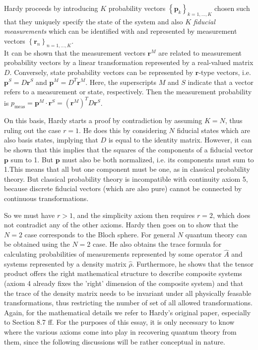 \documentclass[11pt, a4paper]{article}
\begin{document}
Hardy proceeds by introducing $K$ probability vectors $\left\{\mathbf p_k\right\}_{k=1,\ldots,K}$ chosen such that they uniquely specify the state of the system and also $K$ \emph{fiducial measurements} which can be identified with and represented by measurement vectors $\left\{\mathbf r_n\right\}_{n=1,\ldots,K}$.\\
It can be shown that the measurement vectors $\mathbf r^M$ are related to measurement probability vectors by a linear transformation represented by a real-valued matrix $D$. Conversely, state probability vectors can be represented by $\mathbf r$-type vectors, i.e. $\mathbf p^S=D\mathbf r^S$ and $\mathbf p^M=D^T\mathbf r^M$. Here, the superscripts $M$ and $S$ indicate that a vector refers to a measurement or state, respectively. Then the measurement probability is $p_{\mathrm{meas}}=\mathbf p^M\cdot \mathbf r^S=(\mathbf r^M)^TD\mathbf r^S$.\par
On this basis, Hardy starts a proof by contradiction by assuming $K=N$, thus ruling out the case $r=1$. He does this by considering $N$ fiducial states which are also basis states, implying that $D$ is equal to the identity matrix. However, it can be shown that this implies that the squares of the components of a fiducial vector $\mathbf p$ sum to 1. But $\mathbf p$ must also be both normalized, i.e. its components must sum to 1.This means that all but one component must be one, as in classical probability theory. But classical probability theory is incompatible with continuity axiom 5, because discrete fiducial vectors (which are also pure) cannot be connected by continuous transformations. \par
So we must have $r>1$, and the simplicity axiom then requires $r=2$, which does not contradict any of the other axioms. Hardy then goes on to show that the $N=2$ case corresponds to the Bloch sphere. For general $N$ quantum theory can be obtained using the $N=2$ case.  He also obtains the trace formula for calculating probabilities of measurements represented by some operator $\hat A$ and systems represented by a density matrix $\hat\rho$. Furthermore, he shows that the tensor product offers the right mathematical structure to describe composite systems (axiom 4 already fixes the 'right' dimension of the composite system) and that the trace of the density matrix needs to be invariant under all physically feasable transformations, thus restricting the number of set of all allowed transformations. Again, for the mathematical details we refer to Hardy's original paper, especially to Section 8.7 ff. For the purposes of this essay, it is only necessary to know where the various axioms come into play in recovering quantum theory from them, since the following discussions will be rather conceptual in nature.\par
\end{document}
